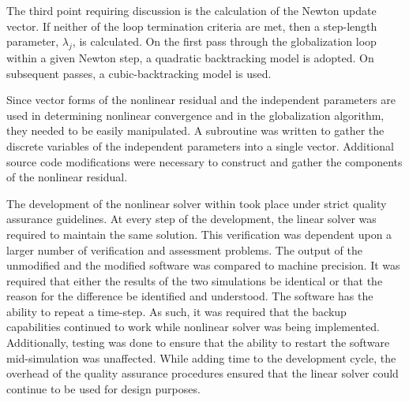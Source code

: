 The third point requiring discussion is the calculation of the Newton update vector.
If neither of the loop termination criteria are met, then a step-length parameter, $\lambda_j$, is calculated.
On the first pass through the globalization loop within a given Newton step, a quadratic backtracking model is adopted.
On subsequent passes, a cubic-backtracking model is used.
 
Since vector forms of the nonlinear residual and the independent parameters are used in determining nonlinear convergence and in the globalization algorithm, they needed to be easily manipulated.
A subroutine was written to gather the discrete variables of the independent parameters into a single vector.
Additional source code modifications were necessary to construct and gather the components of the nonlinear residual.

The development of the nonlinear solver within \cobra{} took place under strict quality assurance guidelines.
At every step of the development, the linear solver was required to maintain the same solution.
This verification was dependent upon a larger number of verification and assessment problems.
The output of the unmodified \cobra{} and the modified \cobra{} software was compared to machine precision.
It was required that either the results of the two simulations be identical or that the reason for the difference be identified and understood.
The \cobra{} software has the ability to repeat a time-step.
As such, it was required that the backup capabilities continued to work while nonlinear solver was being implemented.
Additionally, testing was done to ensure that the ability to restart the software mid-simulation was unaffected.
While adding time to the development cycle, the overhead of the quality assurance procedures ensured that the linear solver could continue to be used for design purposes.

